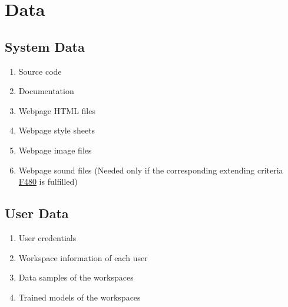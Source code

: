 \section{Data}
\subsection{System Data}
\begin{enumerate}[{label = \textbf{/D{\protect\twodigits{\arabic{enumi}}}0/}, leftmargin = *}]
    \item Source code   %
    \item Documentation %
    \item Webpage HTML files
    \item Webpage style sheets
    \item Webpage image files
    \item Webpage sound files (Needed only if the corresponding extending criteria \hyperref[/F480/]{F480} is fulfilled)
\end{enumerate}

\subsection{User Data}
\begin{enumerate}[resume*]
    \item User credentials
    \item Workspace information of each user
    \item Data samples of the workspaces
    \item Trained models of the workspaces
\end{enumerate}
